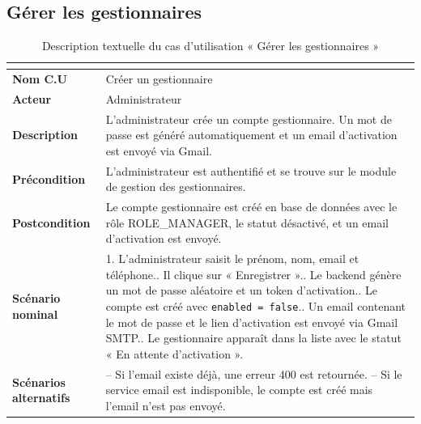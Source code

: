 \subsection{Gérer les gestionnaires}

\begin{table}[H]
  \centering
  \caption{Description textuelle du cas d'utilisation « Gérer les gestionnaires »}
  \label{tab:cu_managers}
  \renewcommand{\arraystretch}{1.4}
  \begin{tabularx}{\textwidth}{|>{\bfseries}l|L|}
    \hline
     \\
    \hline
    Nom C.U & Créer un gestionnaire \\
    \hline
    Acteur & Administrateur \\
    \hline
    Description & L'administrateur crée un compte gestionnaire. Un mot de passe est généré
      automatiquement et un email d'activation est envoyé via Gmail. \\
    \hline
    Précondition & L'administrateur est authentifié et se trouve sur le module de gestion
      des gestionnaires. \\
    \hline
    Postcondition & Le compte gestionnaire est créé en base de données avec le rôle
      ROLE\_MANAGER, le statut désactivé, et un email d'activation est envoyé. \\
    \hline
    Scénario nominal &
      1. L'administrateur saisit le prénom, nom, email et téléphone.. Il clique sur « Enregistrer ».. Le backend génère un mot de passe aléatoire et un token d'activation.. Le compte est créé avec \texttt{enabled = false}.. Un email contenant le mot de passe et le lien d'activation est envoyé via Gmail SMTP.. Le gestionnaire apparaît dans la liste avec le statut « En attente d'activation ». \\
    \hline
    Scénarios alternatifs &
      -- Si l'email existe déjà, une erreur 400 est retournée.\newline
      -- Si le service email est indisponible, le compte est créé mais l'email n'est pas envoyé. \\
    \hline
  \end{tabularx}
\end{table}


